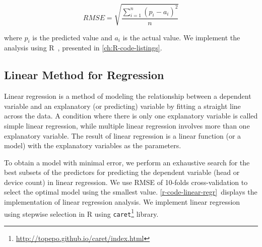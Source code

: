 \begin{equation} \label{eq:rmse}
 RMSE=\sqrt { \frac { \sum _{ i=1 }^{ n }{ { \left( { p }_{ i }-{ a }_{ i } \right)  }^{ 2 } }  }{ n }  } 
\end{equation}

where ${ p }_{ i }$ is the predicted value and ${ a }_{ i }$ is the actual value. We implement the analysis using R~\cite{r-team}, presented in \autoref{ch:R-code-listings}.


	\subsection{Linear Method for Regression} %
	\label{sub:linear_estimator}
	Linear regression is a method of modeling the relationship between a dependent variable and an explanatory (or predicting) variable by fitting a straight line across the data. A condition where there is only one explanatory variable is called simple linear regression, while multiple linear regression involves more than one explanatory variable. The result of linear regression is a linear function (or a model) with the explanatory variables as the parameters.

	To obtain a model with minimal error, we perform an exhaustive search for the best subsets of the predictors for predicting the dependent variable (head or device count) in linear regression. We use \ac{RMSE} of 10-folds cross-validation to select the optimal model using the smallest value. \autoref{r-code-linear-regr}~displays the implementation of linear regression analysis. We implement linear regression using stepwise selection in R using \verb|caret|\footnote{\url{http://topepo.github.io/caret/index.html}} library.
	
